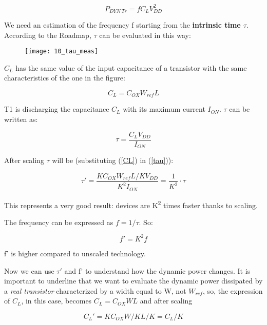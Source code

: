 \documentclass[a4paper, 12pt, twoside, openright]{report}
\newcommand{\super}{\textsuperscript}
\begin{document}
{	\begin{equation}
	P_{DYN \ Tr} =f C_L V_{DD}^2
	\end{equation}

We need an estimation of the frequency f starting from the \textbf{intrinsic time $\tau$}. According to the Roadmap, $\tau$ can be evaluated in this way:

	\begin{figure}[H]
	\centering
	\texttt{[image: 10\_tau\_meas]}
	\caption{}
	\label{}
	\end{figure}

$C_{L}$ has the same value of the input capacitance of a transistor with the same characteristics of the one in the figure:

	\begin{equation}
	C_{L} = C_{OX} W_{ref} L
	\label{CL}
	\end{equation}

T1 is discharging the capacitance $C_{L}$ with its maximum current $I_{ON}$. $\tau$ can be written as:

	\begin{equation}
	\tau = \frac{C_L V_{DD}}{I_{ON}}
	\label{tau}
	\end{equation}

After scaling $\tau$ will be (substituting (\ref{CL}) in (\ref{tau})):

	\begin{equation}
	\tau ' = \frac{K C_{OX} W_{ref} L/K V_{DD}}{K^2 I_{ON}} = \frac{1}{K^2} \cdot \tau
	\end{equation}

This represents a very good result: devices are K\super{2} times faster thanks to scaling.

The frequency can be expressed as $f = 1/\tau$. So:

	\begin{equation}
	f' = K^2 f
	\end{equation}

f' is higher compared to unscaled technology.

Now we can use $\tau'$ and f' to understand how the dynamic power changes. It is important to underline that we want to evaluate the dynamic power dissipated by a \emph{real transistor} characterized by a width equal to W, not $W_{ref}$, so, the expression of $C_{L}$, in this case, becomes $C_L = C_{OX} W L$ and after scaling

	\begin{equation}
	C_L ' = K C_{OX} W/K L/K = C_L/K
	\end{equation}

}
\end{document}
